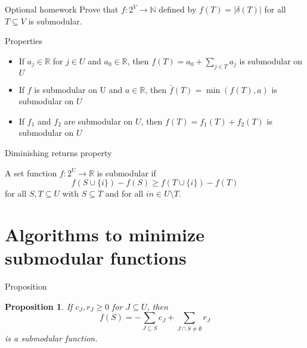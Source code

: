 \documentclass[usenames,dvipsnames]{beamer}
\newcommand{\R}{\mathbb{R}}
\newcommand{\N}{\mathbb{N}}
\newtheorem{prop}{Proposition}
\begin{document}
  \begin{frame}{Optional homework}
    Prove that $f: 2^V \rightarrow \N$ defined by $f(T) = |\delta(T)|$
    for all $T \subseteq V$ is submodular.
  \end{frame}


\begin{frame}{Properties}
  \begin{itemize}
  \item If $a_j \in \R$ for $j \in U$ and $a_0 \in \R$, then $f(T) =
    a_0 + \sum\limits_{j \in T} a_j$ is submodular on $U$
  \item If $f$ is submodular on U and $a \in \R$, then $\bar{f}(T) =
    \min(f(T),a)$ is submodular on $U$
  \item If $f_1$ and $f_2$ are submodular on $U$, then $f(T) = f_1(T)
    + f_2(T)$ is submodular on $U$
  \end{itemize}
\end{frame}

\begin{frame}{Diminishing returns property}
  \begin{definition}
    A set function $f : 2^U \rightarrow \R$ is submodular if \[f(S
    \cup \{i\}) - f(S) \geq f(T \cup \{i\}) - f(T) \] for all $S,T
    \subseteq U$ with $S \subseteq T$ and for all $in \in U \setminus
    T$.
  \end{definition}
\end{frame}

\section{Algorithms to minimize submodular functions}
\begin{frame}{Proposition}
  \begin{prop}\label{prop}
    If $c_J, r_J \geq 0$ for $J \subseteq U$,
    then \begin{equation}f(S) = -\sum\limits_{J \subseteq S} c_J +
      \sum\limits_{J \cap S \neq \emptyset}
      r_J\label{prop}\end{equation} is a submodular function.
  \end{prop}
\end{frame}
\end{document}
